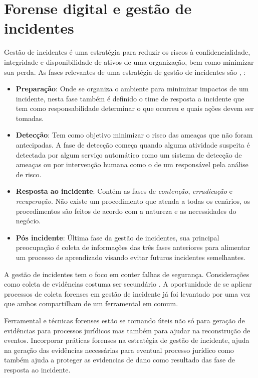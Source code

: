 \section{Forense digital e gestão de incidentes}
\label{sec:forenseeincidentes}

%
Gestão de incidentes é uma estratégia para reduzir os riscos à confidencialidade, integridade e disponibilidade de ativos de uma organização, bem como minimizar sua perda.
%
As fases relevantes de uma estratégia de gestão de incidentes são \cite{AdhiantoFasesGestaoIncidente:2010}, \cite{CichonskiNIST:2012}: 


\begin{itemize}
%
\item \textbf{Preparação}: Onde se organiza o ambiente para minimizar impactos de um incidente, nesta fase também é definido o time de resposta a incidente que tem como responsabilidade determinar o que ocorreu e quais ações devem ser tomadas.
%
\item \textbf{Detecção}: Tem como objetivo minimizar o risco das ameaças que não foram antecipadas. A fase de detecção começa quando alguma atividade suspeita é detectada por algum serviço automático como um sistema de detecção de ameaças ou por intervenção humana como o de um responsável pela análise de risco.
%
\item \textbf{Resposta ao incidente}: Contém as fases de \textit{contenção}, \textit{erradicação} e \textit{recuperação}. Não existe um procedimento que atenda a todas os cenários, os procedimentos são feitos de acordo com a natureza e as necessidades do negócio.
%
\item \textbf{Pós incidente}: Última fase da gestão de incidentes, sua principal preocupação é coleta de informações das três fases anteriores para alimentar um processo de aprendizado visando evitar futuros incidentes semelhantes.

\end{itemize}

A gestão de incidentes tem o foco em conter falhas de segurança. 
%
Considerações como coleta de evidências costuma ser secundário \cite{AdhiantoFasesGestaoIncidente:2010}. 
%
A oportunidade de se aplicar processos de coleta forenses em gestão de incidente já foi levantado por \cite{AdhiantoIncidentHandlingForensic:2016} uma vez que ambos compartilham de um ferramental em comum.
%

%
Ferramental e técnicas forenses estão se tornando úteis não só para geração de evidências para processos jurídicos mas também para ajudar na reconstrução de eventos.
%
Incorporar práticas forenses na estratégia de gestão de incidente, ajuda na geração das evidências necessárias para eventual processo jurídico como também ajuda a proteger as evidencias de dano como resultado das fase de resposta ao incidente.





